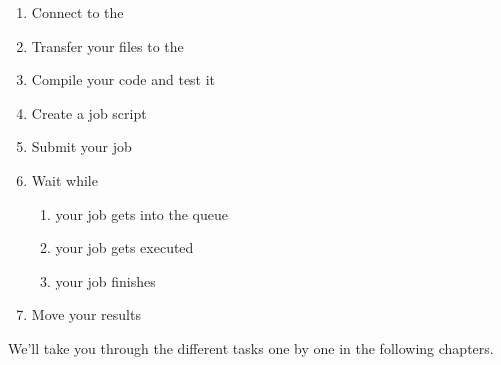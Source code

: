 \begin{enumerate}
  \item  Connect to the \hpc
  \item  Transfer your files to the \hpc
  \item  Compile your code and test it
  \item  Create a job script
  \item  Submit your job
  \item  Wait while
  \begin{enumerate}
    \item  your job gets into the queue
    \item  your job gets executed
    \item  your job finishes
  \end{enumerate}
  \item  Move your results
\end{enumerate}

We'll take you through the different tasks one by one in the following
chapters.
